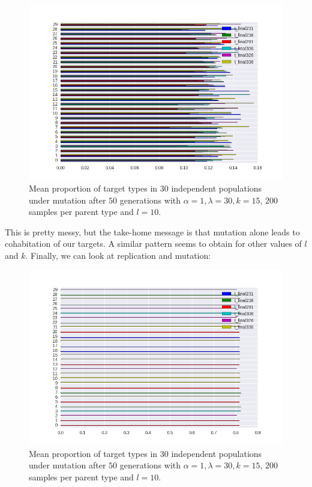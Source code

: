\documentclass[a4paper]{article}
\begin{document}
\begin{figure}[h!]
  \centering
    \includegraphics[scale=.8]{../code-LOT-extension/plots/m-lam30-a1-k15-s200-l10-meFalse432-nomean.png}
  \caption{Mean proportion of target types in $30$ independent populations under mutation after $50$ generations with $\alpha = 1, \lambda = 30, k = 15$, $200$ samples per parent type and $l = 10$.}
\end{figure}

This is pretty messy, but the take-home message is that mutation alone leads to cohabitation of our targets. A similar pattern seems to obtain for other values of $l$ and $k$. Finally, we can look at replication and mutation:


\begin{figure}[h!]
  \centering
    \includegraphics[scale=0.8]{../code-LOT-extension/plots/rm-lam30-a1-k15-s200-l10-meFalse432-nomean.png}
  \caption{Mean proportion of target types in $30$ independent populations under mutation after $50$ generations with $\alpha = 1, \lambda = 30, k = 15$, $200$ samples per parent type and $l = 10$.}
\end{figure}
\end{document}
